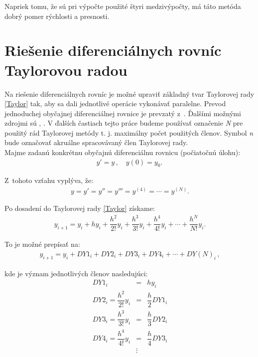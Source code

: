 Napriek tomu, že sú pri výpočte použité štyri medzivýpočty, má táto metóda dobrý pomer rýchlosti a presnosti.


\chapter{Riešenie diferenciálnych rovníc Taylorovou radou} \label{SOLUTION_WITH_TAYLOR}
Na riešenie diferenciálnych rovníc je možné upraviť základný tvar Taylorovej rady \eqref{Taylor} tak, aby sa dali jednotlivé operácie vykonávať paralelne. Prevod jednoduchej obyčajnej diferenciálnej rovnice je prevzatý z~\cite{MatecnyBP}. Ďalšími možnými zdrojmi sú \cite{OpalkaDP}, \cite{KrausDisP}. V ďalších častiach tejto práce budeme používať označenie \textit{N} pre použitý rád Taylorovej metódy t. j. maximálny počet použitých členov. Symbol \textit{n} bude označovať akruálne spracovávaný člen Taylorovej rady. \\

Majme zadanú konkrétnu obyčajnú diferenciálnu rovnicu (počiatočnú úlohu):
\begin{eqnarray}
y' = y \, , \quad y(0) = y_{0}. \, \label{jednoducha_rovnica}
\end{eqnarray}

Z~tohoto vzťahu vyplýva, že:
\begin{eqnarray}
y = y' = y'' = y''' = y^{(4)} =\cdots = y^{(N)} .
\end{eqnarray}

Po dosadení do Taylorovej rady \eqref{Taylor} získame:
\begin{eqnarray}
y_{i + 1} = y_{i} + h y_{i} + \dfrac{h^{2}}{2!}y_{i} + \dfrac{h^{3}}{3!}y_{i} + \dfrac{h^{4}}{4!}y_{i} + \cdots + \dfrac{h^{N}}{N!}y_{i} .
\end{eqnarray}


To je možné prepísať na:
\begin{eqnarray}
y_{i + 1} = y_{i} + DY1_{i} + DY2_{i} + DY3_{i} + DY4_{i} + \cdots + DY(N)_{i} \, , \label{TaylorDYcleny}
\end{eqnarray}

kde je význam jednotlivých členov nasledujúci:
\begin{eqnarray}
DY1_{i} & = & h y_{i} \label{DY_cleny} \\
DY2_{i} = \dfrac{h^{2}}{2!}y_{i} & = & \dfrac{h}{2} DY1_{i} \nonumber \\
DY3_{i} = \dfrac{h^{3}}{3!}y_{i} & = & \dfrac{h}{3} DY2_{i} \nonumber \\
DY4_{i} = \dfrac{h^{4}}{4!}y_{i} & = & \dfrac{h}{4} DY3_{i} \nonumber \\
& \vdots & \nonumber
\end{eqnarray}

